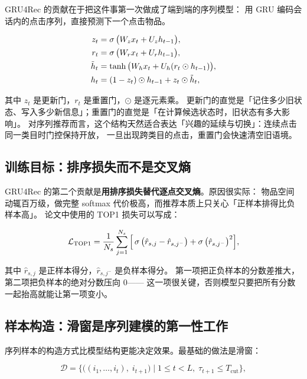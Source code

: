 GRU4Rec \cite{hidasi2016gru4rec} 的贡献在于把这件事第一次做成了端到端的序列模型：
用 GRU 编码会话内的点击序列，直接预测下一个点击物品。

\begin{equation}
\begin{aligned}
z_t &= \operatorname{\sigma}\big( W_z x_t + U_z h_{t-1} \big), \\
r_t &= \operatorname{\sigma}\big( W_r x_t + U_r h_{t-1} \big), \\
\tilde{h}_t &= \tanh\big( W_h x_t + U_h ( r_t \odot h_{t-1} ) \big), \\
h_t &= (1 - z_t) \odot h_{t-1} + z_t \odot \tilde{h}_t ,
\end{aligned}
\label{eq:gru}
\end{equation}

其中 $z_t$ 是更新门，$r_t$ 是重置门，$\odot$ 是逐元素乘。
更新门的直觉是「记住多少旧状态、写入多少新信息」；重置门的直觉是「在计算候选状态时，旧状态有多大影响」。
对序列推荐而言，这个结构天然适合表达「兴趣的延续与切换」：连续点击同一类目时门控保持开放，
一旦出现跨类目的点击，重置门会快速清空旧语境。

\subsection{训练目标：排序损失而不是交叉熵}

GRU4Rec 的第二个贡献是\textbf{用排序损失替代逐点交叉熵}。原因很实际：
物品空间动辄百万级，做完整 softmax 代价极高，而推荐本质上只关心「正样本排得比负样本高」。
论文中使用的 TOP1 损失可以写成：

\begin{equation}
\mathcal{L}_{\text{TOP1}} = \frac{1}{N_s} \sum_{j=1}^{N_s}
\Big[ \operatorname{\sigma}\big( \hat{r}_{s,j} - \hat{r}_{s,j^{-}} \big)
+ \operatorname{\sigma}\big( \hat{r}_{s,j^{-}} \big)^2 \Big],
\label{eq:gru4rec-loss}
\end{equation}

其中 $\hat{r}_{s,j}$ 是正样本得分，$\hat{r}_{s,j^{-}}$ 是负样本得分。
第一项把正负样本的分数差推大，第二项把负样本的绝对分数压向 $0$——
这一项很关键，否则模型只要把所有分数一起抬高就能让第一项变小。

\subsection{样本构造：滑窗是序列建模的第一性工作}

序列样本的构造方式比模型结构更能决定效果。最基础的做法是滑窗：

\begin{equation}
\mathcal{D} = \Big\{ \big( (i_1, \dots, i_t),\; i_{t+1} \big) \;\Big|\;
1 \le t < L,\; \tau_{t+1} \le T_{\text{cut}} \Big\},
\label{eq:sliding-window}
\end{equation}

